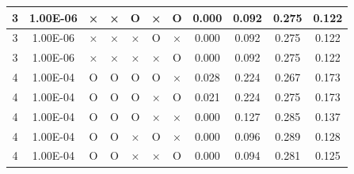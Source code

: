 \documentclass[11pt]{article}
\begin{document}
\begin{longtable}[h]{|r|r|l|l|l|l|l|r|r|l|r|}
\multicolumn{1}{|c|}{3} & \multicolumn{1}{c|}{1.00E-06} & \multicolumn{1}{c|}{×} & \multicolumn{1}{c|}{×} & \multicolumn{1}{c|}{O} & \multicolumn{1}{c|}{×} & \multicolumn{1}{c|}{O} & \multicolumn{1}{c|}{0.000} & \multicolumn{1}{c|}{0.092} & \multicolumn{1}{c|}{0.275} & \multicolumn{1}{c|}{0.122} \\ \hline
\multicolumn{1}{|c|}{3} & \multicolumn{1}{c|}{1.00E-06} & \multicolumn{1}{c|}{×} & \multicolumn{1}{c|}{×} & \multicolumn{1}{c|}{×} & \multicolumn{1}{c|}{O} & \multicolumn{1}{c|}{×} & \multicolumn{1}{c|}{0.000} & \multicolumn{1}{c|}{0.092} & \multicolumn{1}{c|}{0.275} & \multicolumn{1}{c|}{0.122} \\ \hline
\multicolumn{1}{|c|}{3} & \multicolumn{1}{c|}{1.00E-06} & \multicolumn{1}{c|}{×} & \multicolumn{1}{c|}{×} & \multicolumn{1}{c|}{×} & \multicolumn{1}{c|}{×} & \multicolumn{1}{c|}{O} & \multicolumn{1}{c|}{0.000} & \multicolumn{1}{c|}{0.092} & \multicolumn{1}{c|}{0.275} & \multicolumn{1}{c|}{0.122} \\ \hline
\multicolumn{1}{|c|}{4} & \multicolumn{1}{c|}{1.00E-04} & \multicolumn{1}{c|}{O} & \multicolumn{1}{c|}{O} & \multicolumn{1}{c|}{O} & \multicolumn{1}{c|}{O} & \multicolumn{1}{c|}{×} & \multicolumn{1}{c|}{0.028} & \multicolumn{1}{c|}{0.224} & \multicolumn{1}{c|}{0.267} & \multicolumn{1}{c|}{0.173} \\ \hline
\multicolumn{1}{|c|}{4} & \multicolumn{1}{c|}{1.00E-04} & \multicolumn{1}{c|}{O} & \multicolumn{1}{c|}{O} & \multicolumn{1}{c|}{O} & \multicolumn{1}{c|}{×} & \multicolumn{1}{c|}{O} & \multicolumn{1}{c|}{0.021} & \multicolumn{1}{c|}{0.224} & \multicolumn{1}{c|}{0.275} & \multicolumn{1}{c|}{0.173} \\ \hline
\multicolumn{1}{|c|}{4} & \multicolumn{1}{c|}{1.00E-04} & \multicolumn{1}{c|}{O} & \multicolumn{1}{c|}{O} & \multicolumn{1}{c|}{O} & \multicolumn{1}{c|}{×} & \multicolumn{1}{c|}{×} & \multicolumn{1}{c|}{0.000} & \multicolumn{1}{c|}{0.127} & \multicolumn{1}{c|}{0.285} & \multicolumn{1}{c|}{0.137} \\ \hline
\multicolumn{1}{|c|}{4} & \multicolumn{1}{c|}{1.00E-04} & \multicolumn{1}{c|}{O} & \multicolumn{1}{c|}{O} & \multicolumn{1}{c|}{×} & \multicolumn{1}{c|}{O} & \multicolumn{1}{c|}{×} & \multicolumn{1}{c|}{0.000} & \multicolumn{1}{c|}{0.096} & \multicolumn{1}{c|}{0.289} & \multicolumn{1}{c|}{0.128} \\ \hline
\multicolumn{1}{|c|}{4} & \multicolumn{1}{c|}{1.00E-04} & \multicolumn{1}{c|}{O} & \multicolumn{1}{c|}{O} & \multicolumn{1}{c|}{×} & \multicolumn{1}{c|}{×} & \multicolumn{1}{c|}{O} & \multicolumn{1}{c|}{0.000} & \multicolumn{1}{c|}{0.094} & \multicolumn{1}{c|}{0.281} & \multicolumn{1}{c|}{0.125} \\ \hline

\end{longtable}
\end{document}
